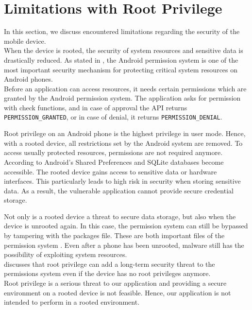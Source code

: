 \section{Limitations with Root Privilege} \label{limitations}
In this section, we discuss encountered limitations regarding the security of the mobile device. \\
When the device is rooted, the security of system resources and sensitive data is drastically reduced. As stated in \cite{ZhangWJWL14}, the Android permission system is one of the most important security mechanism for protecting critical system resources on Android phones. \\
Before an application can access resources, it needs certain permissions which are granted by the Android permission system. The application asks for permission with check functions, and in case of approval the API returns \texttt{PERMISSION\_GRANTED}, or in case of denial, it returns \texttt{PERMISSION\_DENIAL}.

Root privilege on an Android phone is the highest privilege in user mode. Hence, with a rooted device, all restrictions set by the Android system are removed. To access usually protected resources, permissions are not required anymore. According to \cite{ShezanAI17} Android's Shared Preferences and SQLite databases become accessible. The rooted device gains access to sensitive data or hardware interfaces. This particularly leads to high risk in security when storing sensitive data. As a result, the vulnerable application cannot provide secure credential storage.

Not only is a rooted device a threat to secure data storage, but also when the device is unrooted again. In this case, the permission system can still be bypassed by tampering with the packages file. These are both important files of the permission system \cite{ZhangWJWL14}. Even after a phone has been unrooted, malware still has the possibility of exploiting system resources. \\ \cite{ZhangWJWL14} discusses that root privilege can add a long-term security threat to the permissions system even if the device has no root privileges anymore. \\
Root privilege is a serious threat to our application and providing a secure environment on a rooted device is not feasible. Hence, our application is not intended to perform in a rooted environment.